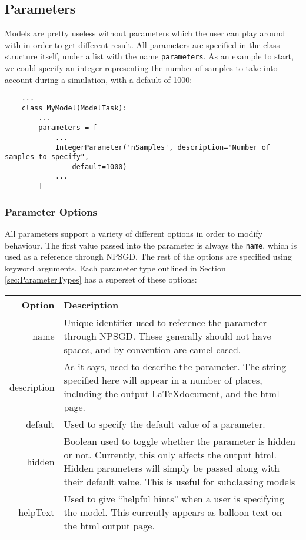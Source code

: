 \documentclass{article}
\newcommand{\mpath}[1]{\texttt{#1}}
\begin{document}
\subsection{Parameters}
Models are pretty useless without parameters which the user can play around with
in order to get different result. All parameters are specified in
the class structure itself, under a list with the name \mpath{parameters}. As an
example to start, we could specify an integer representing the number of samples
to take into account during a simulation, with a default of 1000:
\begin{lstlisting}
    ...
    class MyModel(ModelTask):
        ...
        parameters = [
            ...
            IntegerParameter('nSamples', description="Number of samples to specify",
                default=1000)
            ...
        ]

\end{lstlisting}

\subsubsection{Parameter Options}
All parameters support a variety of different options in order to modify
behaviour. The first value passed into the parameter is always the
\texttt{name}, which is used as a reference through NPSGD. The rest of the
options are specified using keyword arguments. Each parameter type outlined in
Section \ref{sec:ParameterTypes} has a superset of these options:\\
\begin{tabular}{ r p{4in} }
    \textbf{Option} & \textbf{Description} \\
    \hline
    name & Unique identifier used to reference the parameter through NPSGD.
           These generally should not have spaces, and by convention are camel
           cased. \\
    description & As it says, used to describe the parameter. The string
                  specified here will appear in a number of places, including
                  the output \LaTeX document, and the html page. \\
    default & Used to specify the default value of a parameter. \\
    hidden  & Boolean used to toggle whether the parameter is hidden or not.
              Currently, this only affects the output html. Hidden parameters will simply
              be passed along with their default value. This is useful for
              subclassing models\\
    helpText & Used to give ``helpful hints'' when a user is specifying the
               model. This currently appears as balloon text on the html output
               page.
\end{tabular}
\end{document}
